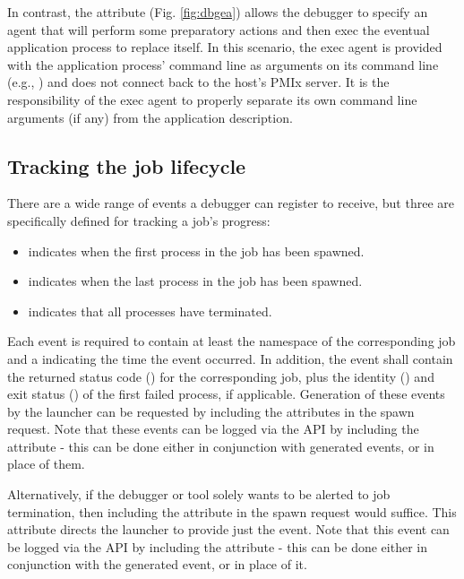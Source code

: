{In contrast, the  attribute (Fig. \ref{fig:dbgea}) allows the debugger to specify an agent that will perform some preparatory actions and then exec the eventual application process to replace itself. In this scenario, the exec agent is provided with the application process' command line as arguments on its command line (e.g., ) and does not connect back to the host's \ac{PMIx} server. It is the responsibility of the exec agent to properly separate its own command line arguments (if any) from the application description.

\subsection{Tracking the job lifecycle}
\label{api:tools:trkjob}

There are a wide range of events a debugger can register to receive, but three
are specifically defined for tracking a job's progress:

\begin{itemize}
    \item {} indicates when the first process in
    the job has been spawned.
    \item {} indicates when the last process in
    the job has been spawned.
    \item {} indicates that all processes have
    terminated.
\end{itemize}

Each event is required to contain at least the namespace of the corresponding
job and a  indicating the time the event
occurred. In addition, the  event shall contain
the returned status code () for the
corresponding job, plus the identity () and exit status
() of the first failed process, if applicable.
Generation of these events by the launcher can be requested by including the
 attributes in the spawn request. Note that
these events can be logged via the  \ac{API} by
including the  attribute - this can be done either
in conjunction with generated events, or in place of them.

Alternatively, if the debugger or tool solely wants to be alerted to job
termination, then including the  attribute in
the spawn request would suffice. This attribute directs the launcher to provide
just the  event. Note that this event can be
logged via the  \ac{API} by including the
 attribute - this can be done either in
conjunction with the generated event, or in place of it.

}
